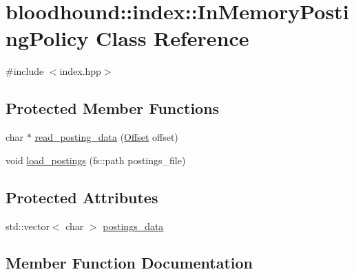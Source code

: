 \hypertarget{classbloodhound_1_1index_1_1InMemoryPostingPolicy}{}\section{bloodhound\+:\+:index\+:\+:In\+Memory\+Posting\+Policy Class Reference}
\label{classbloodhound_1_1index_1_1InMemoryPostingPolicy}


{\ttfamily \#include $<$index.\+hpp$>$}

\subsection*{Protected Member Functions}
\begin{DoxyCompactItemize}
\item 
char $\ast$ \hyperlink{classbloodhound_1_1index_1_1InMemoryPostingPolicy_acc5567fd6ba17861290ba045567e7e1a}{read\+\_\+posting\+\_\+data} (\hyperlink{structbloodhound_1_1Offset}{Offset} offset)
\item 
void \hyperlink{classbloodhound_1_1index_1_1InMemoryPostingPolicy_a68a2a76f7b4349ade63f83acfd6a1dc5}{load\+\_\+postings} (fs\+::path postings\+\_\+file)
\end{DoxyCompactItemize}
\subsection*{Protected Attributes}
\begin{DoxyCompactItemize}
\item 
std\+::vector$<$ char $>$ \hyperlink{classbloodhound_1_1index_1_1InMemoryPostingPolicy_ae760569f621a8b6260cbc50c144be0bf}{postings\+\_\+data}
\end{DoxyCompactItemize}


\subsection{Member Function Documentation}
\mbox{\label{classbloodhound_1_1index_1_1InMemoryPostingPolicy_a68a2a76f7b4349ade63f83acfd6a1dc5}} 
